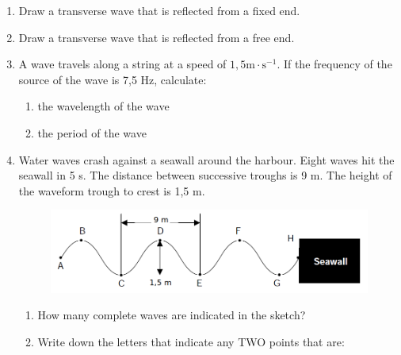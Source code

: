 \begin{enumerate}[noitemsep, label=\textbf{\arabic*}. ]
\begin{figure}[H]
\begin{center}
      \vspace{2pt}
    \vspace{.1in}
    \end{center}
 \end{figure}               \label{m38806*uid126}\item Draw a transverse wave that is reflected from a fixed end.\newline
\label{m38806*uid127}\item Draw a transverse wave that is reflected from a free end.\newline
\label{m38806*uid128}\item A wave travels along a string at a speed of $1,5\mathrm{m}\ensuremath{\cdot}\mathrm{s}{}^{-1}$. If the frequency of the source of the wave is 7,5 Hz, calculate:
\label{m38806*id324525}\begin{enumerate}[noitemsep, label=\textbf{\alph*}. ] 
            \label{m38806*uid129}\item the wavelength of the wave
\label{m38806*uid130}\item the period of the wave
\end{enumerate}
                \item Water waves crash against a seawall around the harbour. Eight waves hit the seawall in 5 s. The distance between successive troughs is 9 m. The height of the waveform trough to crest is 1,5 m. 
    \setcounter{subfigure}{0}
	\begin{figure}[H] %
    \begin{center}
    \label{m38806*id634524!!!underscore!!!media}\label{m38806*id634524!!!underscore!!!printimage}\includegraphics[width=0.8\columnwidth]{col11305.imgs/m38806_seawall.png} %
      \vspace{2pt}
    \vspace{.1in}
    \end{center}
 \end{figure}       
\label{m38806*uid081231}\begin{enumerate}[noitemsep, label=\textbf{\alph*}. ] 
            \item How many complete waves are indicated in the sketch?\item Write down the letters that indicate any TWO points that are:

\end{enumerate}
\end{enumerate}
